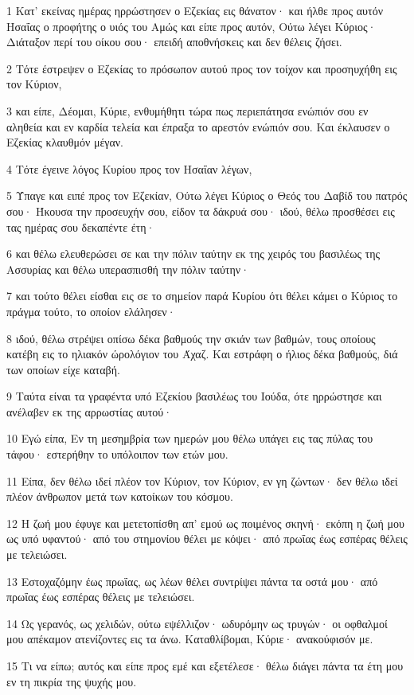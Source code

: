 \par 1 Κατ' εκείνας ημέρας ηρρώστησεν ο Εζεκίας εις θάνατον· και ήλθε προς αυτόν Ησαΐας ο προφήτης ο υιός του Αμώς και είπε προς αυτόν, Ούτω λέγει Κύριος· Διάταξον περί του οίκου σου· επειδή αποθνήσκεις και δεν θέλεις ζήσει.
\par 2 Τότε έστρεψεν ο Εζεκίας το πρόσωπον αυτού προς τον τοίχον και προσηυχήθη εις τον Κύριον,
\par 3 και είπε, Δέομαι, Κύριε, ενθυμήθητι τώρα πως περιεπάτησα ενώπιόν σου εν αληθεία και εν καρδία τελεία και έπραξα το αρεστόν ενώπιόν σου. Και έκλαυσεν ο Εζεκίας κλαυθμόν μέγαν.
\par 4 Τότε έγεινε λόγος Κυρίου προς τον Ησαΐαν λέγων,
\par 5 Ύπαγε και ειπέ προς τον Εζεκίαν, Ούτω λέγει Κύριος ο Θεός του Δαβίδ του πατρός σου· Ήκουσα την προσευχήν σου, είδον τα δάκρυά σου· ιδού, θέλω προσθέσει εις τας ημέρας σου δεκαπέντε έτη·
\par 6 και θέλω ελευθερώσει σε και την πόλιν ταύτην εκ της χειρός του βασιλέως της Ασσυρίας και θέλω υπερασπισθή την πόλιν ταύτην·
\par 7 και τούτο θέλει είσθαι εις σε το σημείον παρά Κυρίου ότι θέλει κάμει ο Κύριος το πράγμα τούτο, το οποίον ελάλησεν·
\par 8 ιδού, θέλω στρέψει οπίσω δέκα βαθμούς την σκιάν των βαθμών, τους οποίους κατέβη εις το ηλιακόν ώρολόγιον του Άχαζ. Και εστράφη ο ήλιος δέκα βαθμούς, διά των οποίων είχε καταβή.
\par 9 Ταύτα είναι τα γραφέντα υπό Εζεκίου βασιλέως του Ιούδα, ότε ηρρώστησε και ανέλαβεν εκ της αρρωστίας αυτού·
\par 10 Εγώ είπα, Εν τη μεσημβρία των ημερών μου θέλω υπάγει εις τας πύλας του τάφου· εστερήθην το υπόλοιπον των ετών μου.
\par 11 Είπα, δεν θέλω ιδεί πλέον τον Κύριον, τον Κύριον, εν γη ζώντων· δεν θέλω ιδεί πλέον άνθρωπον μετά των κατοίκων του κόσμου.
\par 12 Η ζωή μου έφυγε και μετετοπίσθη απ' εμού ως ποιμένος σκηνή· εκόπη η ζωή μου ως υπό υφαντού· από του στημονίου θέλει με κόψει· από πρωΐας έως εσπέρας θέλεις με τελειώσει.
\par 13 Εστοχαζόμην έως πρωΐας, ως λέων θέλει συντρίψει πάντα τα οστά μου· από πρωΐας έως εσπέρας θέλεις με τελειώσει.
\par 14 Ως γερανός, ως χελιδών, ούτω εψέλλιζον· ωδυρόμην ως τρυγών· οι οφθαλμοί μου απέκαμον ατενίζοντες εις τα άνω. Καταθλίβομαι, Κύριε· ανακούφισόν με.
\par 15 Τι να είπω; αυτός και είπε προς εμέ και εξετέλεσε· θέλω διάγει πάντα τα έτη μου εν τη πικρία της ψυχής μου.

